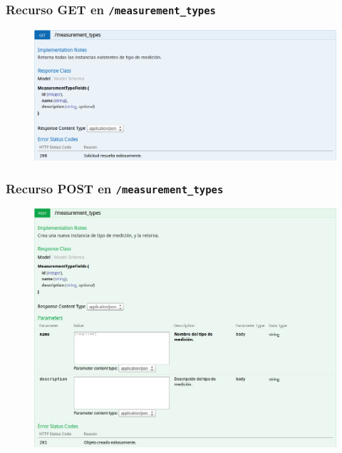 \newpage


\subsubsection{Recurso GET en \texttt{/measurement\_types}}

\begin{figure}[h]
  \centering
  \includegraphics[width=\textwidth,height=.75\textheight,keepaspectratio]{img/especificacion_api/measurementTypeList_get}
  \label{measurementTypeList_get}
\end{figure}

\newpage


\subsubsection{Recurso POST en \texttt{/measurement\_types}}

\begin{figure}[h]
  \centering
  \includegraphics[width=\textwidth,height=.75\textheight,keepaspectratio]{img/especificacion_api/measurementTypeList_post}
  \label{measurementTypeList_post}
\end{figure}

